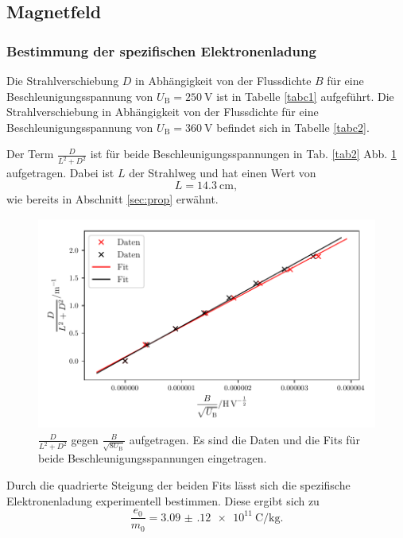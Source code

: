 \subsection{Magnetfeld}
\subsubsection{Bestimmung der spezifischen Elektronenladung}
Die Strahlverschiebung $D$ in Abhängigkeit von der Flussdichte $B$
für eine Beschleunigungsspannung von $U_\text{B} = \SI{250}{\volt}$
ist in Tabelle \ref{tabc1} aufgeführt. Die Strahlverschiebung in
Abhängigkeit von der Flussdichte für eine Beschleunigungsspannung
von $U_\text{B} = \SI{360}{\volt}$ befindet sich in Tabelle \ref{tabc2}.



\noindent Der Term $\frac{D}{L^2 + D^2}$ ist für beide Beschleunigungsspannungen
in Tab. \ref{tab2} Abb. \ref{fig:plot2} aufgetragen. Dabei ist $L$ der Strahlweg und
hat einen Wert von
\begin{equation*}
    L = \SI{14.3}{\centi\meter},
\end{equation*}
wie bereits in Abschnitt \ref{sec:prop} erwähnt.



\begin{figure}
    \centering
    \includegraphics[width=12cm, height=7cm]{build/plot2.pdf}
    \caption{$\frac{D}{L^2 + D^2}$ gegen $\frac{B}{\sqrt{8 U_\text{B}}}$ aufgetragen.
    Es sind die Daten und die Fits für beide Beschleunigungsspannungen
    eingetragen.}
    \label{fig:plot2}
\end{figure}

\noindent Durch die quadrierte Steigung der beiden Fits
lässt sich die spezifische Elektronenladung experimentell bestimmen.
Diese ergibt sich zu
\begin{equation*}
    \frac{e_0}{m_0} = \SI{3.09(12)e11}{\coulomb\per\kilogram}.
\end{equation*}

